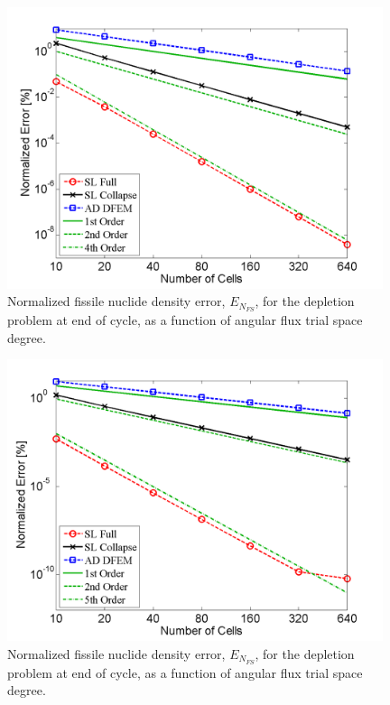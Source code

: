 \begin{figure}[!htp]
\centering
\includegraphics[width=11cm]{chapter5_depletion/FS_P3_norm_err.png}
\caption{Normalized fissile nuclide density error, $E_{N_{FS}}$, for the depletion problem at end of cycle, as a function of angular flux trial space degree.}
\label{fig:depletion_NFS_p3}
\end{figure}

\begin{figure}[!hbp]
\centering
\includegraphics[width=11cm]{chapter5_depletion/FS_P4_norm_err.png}
\caption{Normalized fissile nuclide density error, $E_{N_{FS}}$, for the depletion problem at end of cycle, as a function of angular flux trial space degree.}
\label{fig:depletion_NFS_p4}
\end{figure}

\pagebreak

